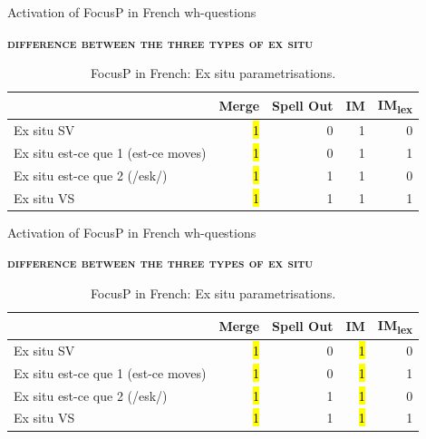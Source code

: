 \documentclass[lesson_slides]{subfiles}
\begin{document}
\begin{frame}{Activation of FocusP in French wh-questions}

    \noindent \textbf{\textsc{difference between the three types of ex situ}}
    \vspace*{2mm}
    \begin{table}[H]
    \centering
        \begin{tabular}{|l|r|r|r|r|}
        \hline
         & Merge & Spell Out & IM & IM\textsubscript{lex} \\
         \hline
        Ex situ SV & \hl{1} & 0 & 1 & 0 \\
        \hline
        Ex situ est-ce que 1 (est-ce moves) & \hl{1} & 0 & 1 & 1 \\
        \hline
        Ex situ est-ce que 2 (/esk/) & \hl{1} & 1 & 1 & 0 \\
        \hline
        Ex situ VS & \hl{1} & 1 & 1 & 1 \\
        \hline
        \end{tabular}
    \caption{\label{tab:samp}FocusP in French: Ex situ parametrisations.}
    \end{table}
    
    
\end{frame}
\begin{frame}{Activation of FocusP in French wh-questions}

    \noindent \textbf{\textsc{difference between the three types of ex situ}}
    \vspace*{2mm}
    \begin{table}[H]
    \centering
        \begin{tabular}{|l|r|r|r|r|}
        \hline
         & Merge & Spell Out & IM & IM\textsubscript{lex} \\
         \hline
        Ex situ SV & \hl{1} & 0 & \hl{1} & 0 \\
        \hline
        Ex situ est-ce que 1 (est-ce moves) & \hl{1} & 0 & \hl{1} & 1 \\
        \hline
        Ex situ est-ce que 2 (/esk/) & \hl{1} & 1 & \hl{1} & 0 \\
        \hline
        Ex situ VS & \hl{1} & 1 & \hl{1} & 1 \\
        \hline
        \end{tabular}
    \caption{\label{tab:samp}FocusP in French: Ex situ parametrisations.}
    \end{table}
    
    
\end{frame}
\end{document}
